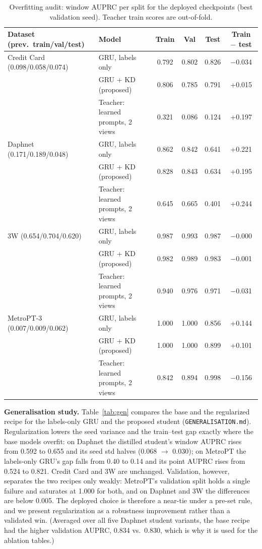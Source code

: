 \documentclass[twoside,english]{article}
\begin{document}
\begin{table}[h]
\centering\small
\caption{Overfitting audit: window AUPRC per split for the deployed checkpoints (best validation seed). Teacher train scores are out-of-fold.}
\label{tab:overfit}
\begin{tabular}{llcccc}
\toprule
Dataset (prev.\ train/val/test) & Model & Train & Val & Test & Train $-$ test \\
\midrule
Credit Card (0.098/0.058/0.074) & GRU, labels only & 0.792 & 0.802 & 0.826 & $-$0.034 \\
 & GRU + KD (proposed) & 0.806 & 0.785 & 0.791 & +0.015 \\
 & Teacher: learned prompts, 2 views & 0.321 & 0.086 & 0.124 & +0.197 \\
\midrule
Daphnet (0.171/0.189/0.048) & GRU, labels only & 0.862 & 0.842 & 0.641 & +0.221 \\
 & GRU + KD (proposed) & 0.828 & 0.843 & 0.634 & +0.195 \\
 & Teacher: learned prompts, 2 views & 0.645 & 0.665 & 0.401 & +0.244 \\
\midrule
3W (0.654/0.704/0.620) & GRU, labels only & 0.987 & 0.993 & 0.987 & $-$0.000 \\
 & GRU + KD (proposed) & 0.982 & 0.989 & 0.983 & $-$0.001 \\
 & Teacher: learned prompts, 2 views & 0.940 & 0.976 & 0.971 & $-$0.031 \\
\midrule
MetroPT-3 (0.007/0.009/0.062) & GRU, labels only & 1.000 & 1.000 & 0.856 & +0.144 \\
 & GRU + KD (proposed) & 1.000 & 1.000 & 0.899 & +0.101 \\
 & Teacher: learned prompts, 2 views & 0.842 & 0.894 & 0.998 & $-$0.156 \\
\bottomrule
\end{tabular}
\end{table}

\textbf{Generalisation study.} Table~\ref{tab:gen} compares the base and the regularized recipe for the labels-only GRU and the proposed student (\texttt{GENERALISATION.md}). Regularization lowers the seed variance and the train--test gap exactly where the base models overfit: on Daphnet the distilled student's window AUPRC rises from 0.592 to 0.655 and its seed std halves (0.068 $\rightarrow$ 0.030); on MetroPT the labels-only GRU's gap falls from 0.40 to 0.14 and its point AUPRC rises from 0.524 to 0.821. Credit Card and 3W are unchanged. Validation, however, separates the two recipes only weakly: MetroPT's validation split holds a single failure and saturates at 1.000 for both, and on Daphnet and 3W the differences are below 0.005. The deployed choice is therefore a near-tie under a pre-set rule, and we present regularization as a robustness improvement rather than a validated win. (Averaged over all five Daphnet student variants, the base recipe had the higher validation AUPRC, 0.834 vs.\ 0.830, which is why it is used for the ablation tables.)
\end{document}
